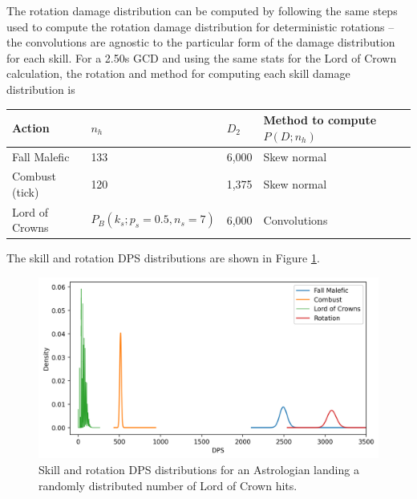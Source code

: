 \documentclass{article}
\begin{document}
    The rotation damage distribution can be computed by following the same steps used to compute the rotation damage distribution for deterministic rotations -- the convolutions are agnostic to the particular form of the damage distribution for each skill. For a 2.50s GCD and using the same stats for the Lord of Crown calculation, the rotation and method for computing each skill damage distribution is
    \begin{table}[H]
        \centering
        \begin{tabular}{@{}llll@{}}
        \toprule
        Action         & $n_h$                        & $D_2$   & Method to compute $P(D;n_h)$ \\ \midrule
        Fall Malefic   & 133                          & 6,000    & Skew normal                  \\
        Combust (tick) & 120                          & 1,375    & Skew normal                  \\
        Lord of Crowns & $P_B(k_s; p_{s}=0.5, n_s=7)$ & 6,000    & Convolutions                 \\ \bottomrule
        \end{tabular}
    \end{table}
    The skill and rotation DPS distributions are shown in Figure \ref{fig:loc-full-rotation}.
    \begin{figure}[H]
        \centering
        \includegraphics[width=0.95\linewidth]{img/lord-of-crowns-rotation.png}
        \caption{Skill and rotation DPS distributions for an Astrologian landing a randomly distributed number of Lord of Crown hits.}\label{fig:loc-full-rotation}
    \end{figure}
    \newpage
\end{document}
